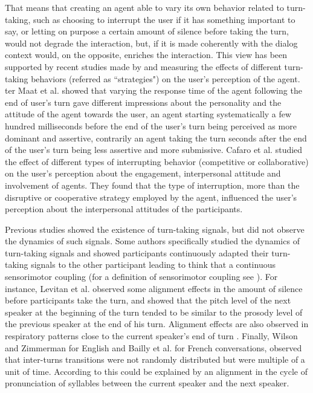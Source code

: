 That means that creating an agent able to vary its
own behavior related to turn-taking, such as choosing to
interrupt the user if it has something important to say,
or letting on purpose a certain amount of silence before
taking the turn, would not degrade the interaction, but,
if it is made coherently with the dialog context would, on the
opposite, enriches the interaction. This view has been
supported by recent studies made by \citep{ter_maat_how_2010} and \citep{cafaro_effects_2016} measuring
the effects of different turn-taking behaviors (referred as ``strategies") on
the user's perception of the agent.
ter Maat et al.\citep{ter_maat_how_2010} showed that varying the response time of the agent following the end of user's turn gave different impressions about the personality and the attitude of the agent towards the user, an agent starting systematically a few hundred milliseconds before the end of the user's turn being perceived as more dominant and assertive, contrarily an agent taking the turn seconds after the end of the user's turn being less assertive and more submissive.  
Cafaro et al.\citep{cafaro_effects_2016} studied the effect of different types of interrupting
behavior (competitive or collaborative) on the user's
perception about the engagement, interpersonal attitude
and involvement of agents. They found that the type of interruption, more than
the disruptive or cooperative strategy employed by the
agent, influenced the user's perception about the interpersonal
attitudes of the participants.
 
Previous studies showed the existence of turn-taking signals, but did not observe the dynamics of such signals.
Some authors specifically studied the dynamics of turn-taking signals and showed participants continuously adapted their turn-taking signals to the other participant leading to think that a continuous sensorimotor coupling (for a definition of sensorimotor coupling see \citep{warren_dynamics_2006}).
For instance,  Levitan et al. \citep{levitan_entrainment_2015} observed some
alignment effects in the amount of silence before participants
take the turn, and showed that the pitch level of
the next speaker at the beginning of the turn tended to
be similar to the prosody level of the previous speaker
at the end of his turn. 
Alignment effects are also observed in respiratory patterns close to the current speaker's end of turn \citep{mcfarland_respiratory_2001}.
Finally, Wilson and Zimmerman\citep{wilson_structure_1986} for English and Bailly et al. \citep{bailly_pauses_2012} for French conversations, observed that inter-turns transitions were not randomly distributed but were multiple of a unit of time. According to \citep{wilson_oscillator_2005} this could be explained by an alignment in the cycle of pronunciation of syllables between
the current speaker and the next speaker.


